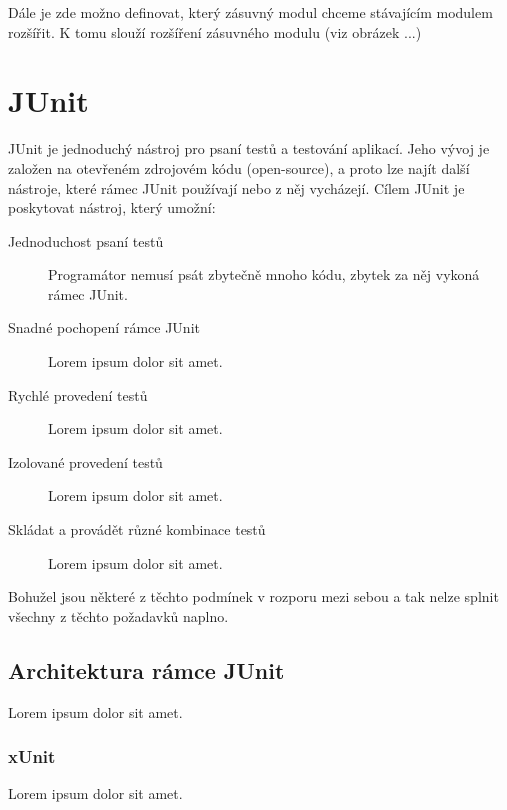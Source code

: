       Dále je zde možno definovat, který zásuvný modul chceme stávajícím modulem rozšířit. K tomu slouží rozšíření zásuvného modulu (viz obrázek ...) 

\chapter{JUnit}                                                           %
JUnit je jednoduchý nástroj pro psaní testů a testování aplikací. Jeho vývoj je založen na otevřeném zdrojovém kódu (open-source), a proto lze najít další nástroje, které rámec JUnit používají nebo z něj vycházejí. Cílem JUnit je poskytovat nástroj, který umožní:
\begin{description}
  \item[Jednoduchost psaní testů]
  Programátor nemusí psát zbytečně mnoho kódu, zbytek za něj vykoná rámec JUnit.
  \item[Snadné pochopení rámce JUnit]
  Lorem ipsum dolor sit amet.
  \item[Rychlé provedení testů]
  Lorem ipsum dolor sit amet.
  \item[Izolované provedení testů]
  Lorem ipsum dolor sit amet.
  \item[Skládat a provádět různé kombinace testů]
  Lorem ipsum dolor sit amet.
\end{description}

Bohužel jsou některé z těchto podmínek v rozporu mezi sebou a tak nelze splnit všechny z těchto požadavků naplno.
  
  \section{Architektura rámce JUnit}
  Lorem ipsum dolor sit amet.
  
    \subsection{xUnit}
    Lorem ipsum dolor sit amet.
    
